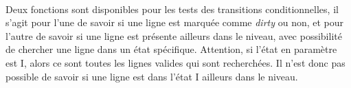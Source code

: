 \paragraph{}
Deux fonctions sont disponibles pour les tests des transitions conditionnelles, il s'agit pour l'une de savoir si une ligne est marquée comme \emph{dirty} ou non, et pour l'autre de savoir si une ligne est présente ailleurs dans le niveau, avec possibilité de chercher une ligne dans un état spécifique. Attention, si l'état en paramètre est I, alors ce sont toutes les lignes valides qui sont recherchées. Il n'est donc pas possible de savoir si une ligne est dans l'état I ailleurs dans le niveau.



